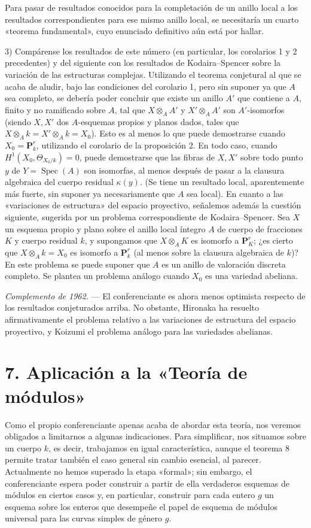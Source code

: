 \documentclass[11pt,twoside,openany]{book}
\numberwithin{equation}{section}
\newcommand{\src}[1]{%
  \phantomsection\hypertarget{src:#1}{}%
  \marginpar{\raggedleft\footnotesize\sffamily #1}%
}
\theoremstyle{plain}
\theoremstyle{definition}
\theoremstyle{remark}
\newcommand{\fsection}[2]{%
  \section*{#1. #2}%
  \addcontentsline{toc}{section}{#1. #2}%
}
\newcommand{\FgaUnitKey}{frontmatter}
\renewcommand{\src}[1]{%
  \phantomsection\hypertarget{src:\FgaUnitKey:#1}{}%
  \marginpar{\raggedleft\footnotesize\sffamily #1}%
}
\theoremstyle{plain}
\theoremstyle{definition}
\theoremstyle{remark}
\begin{document}
Para pasar de resultados conocidos para la completación de un anillo local a
los resultados correspondientes para ese mismo anillo local, se necesitaría un
cuarto «teorema fundamental», cuyo enunciado definitivo aún está por hallar.

\src{207}
3) Compárense los resultados de este número (en particular, los corolarios 1 y
2 precedentes) y del siguiente con los resultados de Kodaira--Spencer sobre la
variación de las estructuras complejas. Utilizando el teorema conjetural al que
se acaba de aludir, bajo las condiciones del corolario 1, pero sin suponer ya
que $A$ sea completo, se debería poder concluir que existe un anillo $A'$ que
contiene a $A$, finito y no ramificado sobre $A$, tal que $X\otimes_A A'$ y
$X'\otimes_A A'$ son $A'$-isomorfos (siendo $X,X'$ dos $A$-esquemas propios y
planos dados, tales que $X\otimes_A k=X'\otimes_A k=X_0$). Esto es al menos lo
que puede demostrarse cuando $X_0=\mathbf P_k^r$, utilizando el corolario de la
proposición 2. En todo caso, cuando $H^1(X_0,\Theta_{X_0/k})=0$, puede
demostrarse que las fibras de $X,X'$ sobre todo punto $y$ de
$Y=\operatorname{Spec}(A)$ son isomorfas, al menos después de pasar a la
clausura algebraica del cuerpo residual $\kappa(y)$. (Se tiene un resultado
local, aparentemente más fuerte, sin suponer ya necesariamente que $A$ sea
local). En cuanto a las «variaciones de estructura» del espacio proyectivo,
señalemos además la cuestión siguiente, sugerida por un problema correspondiente
de Kodaira--Spencer. Sea $X$ un esquema propio y plano sobre el anillo local
íntegro $A$ de cuerpo de fracciones $K$ y cuerpo residual $k$, y supongamos que
$X\otimes_A K$ es isomorfo a $\mathbf P_K^r$; ¿es cierto que
$X\otimes_A k=X_0$ es isomorfo a $\mathbf P_k^r$ (al menos sobre la clausura
algebraica de $k$)? En este problema se puede suponer que $A$ es un anillo de
valoración discreta completo. Se plantea un problema análogo cuando $X_0$ es
una variedad abeliana.

\emph{Complemento de 1962.} --- El conferenciante es ahora menos optimista
respecto de los resultados conjeturados arriba. No obstante, Hironaka ha
resuelto afirmativamente el problema relativo a las variaciones de estructura
del espacio proyectivo, y Koizumi el problema análogo para las variedades
abelianas.

\fsection{7}{Aplicación a la «Teoría de módulos»}

Como el propio conferenciante apenas acaba de abordar esta teoría, nos veremos
obligados a limitarnos a algunas indicaciones. Para simplificar, nos situamos
sobre un cuerpo $k$, es decir, trabajamos en igual característica, aunque el
teorema 8 permite tratar también el caso general sin cambio esencial, al
parecer. Actualmente no hemos superado la etapa «formal»; sin embargo, el
conferenciante espera poder construir a partir de ella verdaderos esquemas de
módulos en ciertos casos y, en particular, construir para cada entero $g$ un
esquema sobre los enteros que desempeñe el papel de esquema de módulos universal
para las curvas simples de género $g$.
\end{document}
